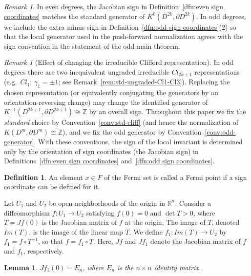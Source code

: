 \documentclass{amsart}
\newtheorem{lem}[thm]{Lemma}
\theoremstyle{definition}
\newtheorem{dfn}[thm]{Definition}
\theoremstyle{remark}
\newtheorem{rem}[thm]{Remark}
\begin{document}
\begin{rem}
In even degrees, the Jacobian sign in Definition~\ref{dfn:even sign coordinates} matches the standard generator of
$K^{0}(D^{2k},\partial D^{2k})$. In odd degrees, we include the extra minus sign in
Definition~\ref{dfn:odd sign coordinates}(2) so that the local generator used in the push-forward normalization
agrees with the sign convention in the statement of the odd main theorem.
\end{rem}

\begin{rem}[Effect of changing the irreducible Clifford  representation]\label{rem:choice-irr- representation}
In odd degrees there are two inequivalent ungraded irreducible $Cl_{2k+1}$ representations
(e.g.\ $Cl_1$: $\gamma_1=\pm 1$; see Remark~\ref{rem:std-ungraded-Cl1-Cl3}).
Replacing the chosen representation (or equivalently conjugating the generators by an orientation-reversing
change) may change the identified generator of
$K^{-1}(D^{2k+1},\partial D^{2k+1})\cong\mathbb Z$ by an overall sign.
Throughout this paper we fix the \emph{standard} choice by Convention~\ref{conv:std-cliff}
(and hence the normalization of $K(D^m,\partial D^m)\cong\mathbb Z$),
and we fix the odd generator by Convention~\ref{conv:odd-generator}.
With these conventions, the sign of the local invariant is determined only by the orientation
of sign coordinates (the Jacobian sign) in Definitions~\ref{dfn:even sign coordinates} and~\ref{dfn:odd sign coordinates}.
\end{rem}

\begin{dfn}
An element $x \in F$ of the Fermi set is called a Fermi point if a sign coordinate can be defined for it.
\end{dfn}
                                                         
Let $U_1$ and $U_2$ be open neighborhoods of the origin in $\mathbb{R}^n$. Consider a diffeomorphism $f\colon U_1 \to U_2$ satisfying $f(0)=0$ and $\det{T}>0$, where $T=Jf(0)$ is the Jacobian matrix of $f$ at the origin. The image of $T$, denoted $Im(T)$, is the image of the linear map $T$. We define $f_1\colon Im(T) \to U_2$ by $f_1=f \circ T^{-1}$, so that $f=f_1 \circ T$. Here, $Jf$ and $Jf_1$ denote the Jacobian matrix of $f$ and $f_1$, respectively.
\begin{lem}\label{lem:decomposition-of-f}
$Jf_1(0)=E_n$, where $E_n$ is the $n\times n$ identity matrix.
\end{lem}
\end{document}
